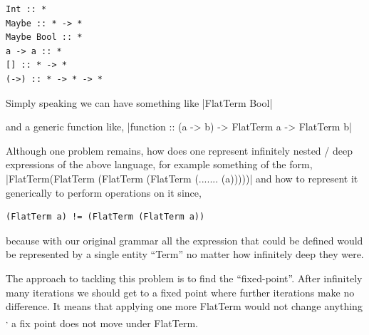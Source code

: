 \documentclass[thesis-solanki.tex]{subfiles}
\begin{document}
\begin{verbatim}
Int :: *
Maybe :: * -> *
Maybe Bool :: *
a -> a :: *
[] :: * -> *
(->) :: * -> * -> *
\end{verbatim}

Simply speaking we can have something like
|FlatTerm Bool|

and a generic function like,
|function :: (a -> b) -> FlatTerm a -> FlatTerm b|

Although one problem remains, how does one represent infinitely nested / deep expressions of the above language,
for example something of the form,
\newline
{}|FlatTerm(FlatTerm (FlatTerm (FlatTerm (....... (a)))))|
\mbox{}\newline
and how to represent it generically to perform operations on it since,
\begin{verbatim}
(FlatTerm a) != (FlatTerm (FlatTerm a))
\end{verbatim}
%
because with our original grammar all the expression that could be defined would be represented by a single entity
``Term'' no matter how infinitely deep they were.

The approach to tackling this problem is to find the ``fixed-point''.
After infinitely many iterations we should get to a fixed point where further iterations make no
difference.
It means that applying one more FlatTerm would not change anything \textsuperscript{,}
a fix point does not move under FlatTerm.
\end{document}
